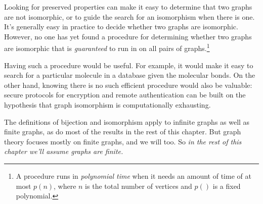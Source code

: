 Looking for preserved properties can make it easy to determine that two
graphs are not isomorphic, or to guide the search for an
isomorphism when there is one.  It's generally easy in practice to decide
whether two graphs are isomorphic.  However, no one has yet found a
procedure for determining whether two graphs are isomorphic that is
\emph{guaranteed} to run in  on all pairs of
graphs.\footnote{A procedure runs in \emph{polynomial
    time} when it needs an amount of time of at most $p(n)$, where $n$ is
  the total number of vertices and $p()$ is a fixed polynomial.}

Having such a procedure would be useful.  For example, it would make it
easy to search for a particular molecule in a database given the molecular
bonds.  On the other hand, knowing there is no such efficient procedure
would also be valuable: secure protocols for encryption and remote
authentication can be built on the hypothesis that graph isomorphism is
computationally exhausting.

\iffalse

An isomorphism between the two graphs shown in
Figure~\ref{fig:isomorphism} is easy to read off:
\[
\begin{array}{lll}
a \text{ corresponds to } 1 & \hspace{0.5in} & b \text{ corresponds to } 2 \\
d \text{ corresponds to } 4 & & c \text{ corresponds to } 3.
\end{array}
\]

To see why this works, look at any edge in the first graph, say
$\edge{b}{c}$, and make sure that the vertices corresponding to $b$ and
$c$ are the endpoints of an edge in the second graph.  Namely, verify that
$\edge{2}{3}$ is an edge of the second graph; and it is.  Conversely, look
at any edge in the second graph, say $\edge{3}{4}$, and verify that the
corresponding vertices are the endpoints of an edge of the first
graph. Namely, verify that $\edge{c}{d}$ is an edge of the first graph;
and it is.  It's a good practice exercise to verify that every edge in
either of these graphs exactly corresponds in this way to an edge in the
other graph.
\fi

The definitions of bijection and isomorphism apply to infinite graphs as
well as finite graphs, as do most of the results in the rest of this
chapter.  But graph theory focuses mostly on finite graphs, and we
will too.  So
\emph{in the rest of this chapter we'll assume graphs are finite.}

